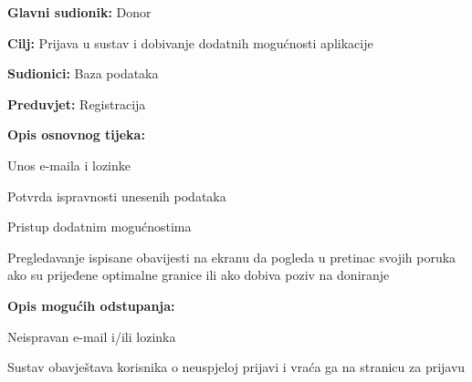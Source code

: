 \eject 
\noindent {}
					\begin{packed_item}
	
						\item \textbf{Glavni sudionik: }Donor
						\item \textbf{Cilj:} Prijava u sustav i dobivanje dodatnih mogućnosti aplikacije
						\item \textbf{Sudionici:} Baza podataka
						\item \textbf{Preduvjet:} Registracija
						\item \textbf{Opis osnovnog tijeka:}
						
						\item[] \begin{packed_enum}
	
							\item Unos e-maila i lozinke
							\item Potvrda ispravnosti unesenih podataka
							\item Pristup dodatnim mogućnostima
							\item Pregledavanje ispisane obavijesti na ekranu da pogleda u pretinac svojih poruka ako su prijeđene optimalne granice ili ako dobiva poziv na doniranje
							
						\end{packed_enum}
						\item  \textbf{Opis mogućih odstupanja:}
						
						\item[] \begin{packed_item}
	
							\item[2.a] Neispravan e-mail i/ili lozinka
							\item[] \begin{packed_enum}
								
								\item  Sustav obavještava korisnika o neuspjeloj prijavi i vraća ga na stranicu za prijavu

								
							\end{packed_enum}
					\end{packed_item}
					\end{packed_item}
\noindent {}
